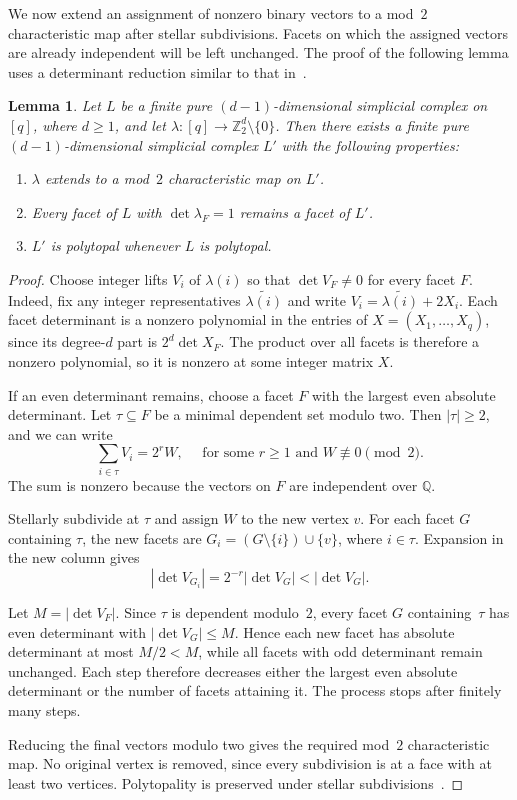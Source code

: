 \documentclass[10pt,a4paper]{amsart}
\theoremstyle{plain}
\newtheorem{lemma}[theorem]{Lemma}
\numberwithin{equation}{section}
\theoremstyle{remark}
\theoremstyle{definition}
\newcommand{\Z}{\mathbb Z}
\newcommand{\Q}{\mathbb Q}
\begin{document}
We now extend an assignment of nonzero binary vectors to a mod~$2$ characteristic map after stellar subdivisions.
Facets on which the assigned vectors are already independent will be left unchanged.
The proof of the following lemma uses a determinant reduction similar to that in~\cite[Theorem~2.1]{Bruns-vonThaden2017}.

\begin{lemma}\label{lem:relative-subdivision}
    Let $L$ be a finite pure $(d-1)$-dimensional simplicial complex on~$[q]$, where $d\ge1$, and let $\lambda\colon[q]\to\Z_2^d\setminus\{0\}$.
    Then there exists a finite pure $(d-1)$-dimensional simplicial complex $L'$ with the following properties:
    \begin{enumerate}
      \item $\lambda$ extends to a mod~$2$ characteristic map on $L'$.
      \item Every facet of $L$ with $\det \lambda_F = 1$ remains a facet of $L'$.
      \item $L'$ is polytopal whenever $L$ is polytopal.
    \end{enumerate}
\end{lemma}
\begin{proof}
    Choose integer lifts $V_i$ of $\lambda(i)$ so that $\det V_F\ne0$ for every facet $F$.
    Indeed, fix any integer representatives $\widetilde{\lambda(i)}$ and write $V_i = \widetilde{\lambda(i)} + 2 X_i$.
    Each facet determinant is a nonzero polynomial in the entries of $X = (X_1, \ldots, X_q)$, since its degree-$d$ part is $2^d \det X_F$.
    The product over all facets is therefore a nonzero polynomial, so it is nonzero at some integer matrix $X$.
    
    If an even determinant remains, choose a facet $F$ with the largest even absolute determinant.
    Let $\tau\subseteq F$ be a minimal dependent set modulo two.
    Then $|\tau|\ge2$, and we can write
    $$
        \sum_{i\in\tau}V_i=2^rW, \quad \text{ for some } r\ge1 \text{ and } W\not\equiv0\pmod2.
    $$
    The sum is nonzero because the vectors on $F$ are independent over $\Q$.
    
    Stellarly subdivide at $\tau$ and assign $W$ to the new vertex $v$.
    For each facet $G$ containing $\tau$, the new facets are $G_i=(G\setminus\{i\})\cup\{v\}$, where $i\in\tau$.
    Expansion in the new column gives
    $$
        |\det V_{G_i}|=2^{-r}|\det V_G|<|\det V_G|.
    $$
    
    Let $M = | \det V_F |$.
    Since $\tau$ is dependent modulo~$2$, every facet $G$ containing~$\tau$ has even determinant with $| \det V_G | \leq M$.
    Hence each new facet has absolute determinant at most $M/2 < M$, while all facets with odd determinant remain unchanged.
    Each step therefore decreases either the largest even absolute determinant or the number of facets attaining it.
    The process stops after finitely many steps.
    
    Reducing the final vectors modulo two gives the required mod~$2$ characteristic map.
    No original vertex is removed, since every subdivision is at a face with at least two vertices.
    Polytopality is preserved under stellar subdivisions~\cite{Ewald-Shephard1974}.
\end{proof}
\end{document}
